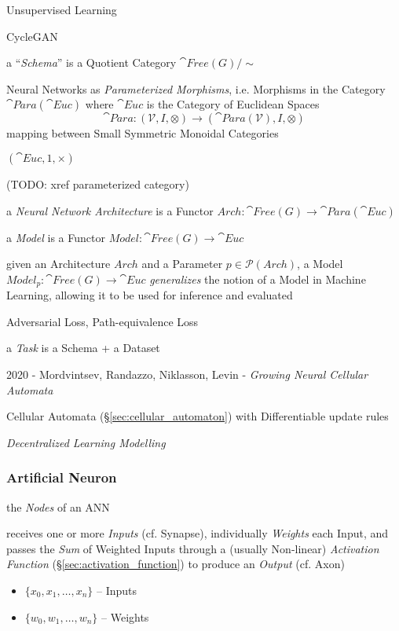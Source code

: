 Unsupervised Learning

CycleGAN

a ``\emph{Schema}'' is a Quotient Category $\cat{Free}(G)/\sim$

Neural Networks as \emph{Parameterized Morphisms}, i.e. Morphisms in the
Category $\cat{Para}(\cat{Euc})$ where $\cat{Euc}$ is the Category of Euclidean
Spaces
\[
  \cat{Para} : (\mathcal{V}, I, \otimes)
    \to (\cat{Para}(\mathcal{V}), I, \otimes)
\]
mapping between Small Symmetric Monoidal Categories

$(\cat{Euc}, 1, \times)$

(TODO: xref parameterized category)

a \emph{Neural Network Architecture} is a Functor
$Arch : \cat{Free}(G) \to \cat{Para}(\cat{Euc})$

a \emph{Model} is a Functor $Model : \cat{Free}(G) \to \cat{Euc}$

given an Architecture $Arch$ and a Parameter $p \in \mathcal{P}(Arch)$, a Model
$Model_p : \cat{Free}(G) \to \cat{Euc}$ \emph{generalizes} the notion of
a Model in Machine Learning, allowing it to be used for inference and evaluated

Adversarial Loss, Path-equivalence Loss

a \emph{Task} is a Schema + a Dataset

\asterism

2020 - Mordvintsev, Randazzo, Niklasson, Levin - \emph{Growing Neural Cellular
  Automata}

Cellular Automata (\S\ref{sec:cellular_automaton}) with Differentiable update
rules

\emph{Decentralized Learning Modelling}



\subsubsection{Artificial Neuron}\label{sec:artificial_neuron}

the \emph{Nodes} of an ANN

receives one or more \emph{Inputs} (cf. Synapse), individually \emph{Weights}
each Input, and passes the \emph{Sum} of Weighted Inputs through a (usually
Non-linear) \emph{Activation Function} (\S\ref{sec:activation_function}) to
produce an \emph{Output} (cf. Axon)

\begin{itemize}
  \item $\{ x_0, x_1, \ldots, x_n \}$ -- Inputs
  \item $\{ w_0, w_1, \ldots, w_n \}$ -- Weights
\end{itemize}

